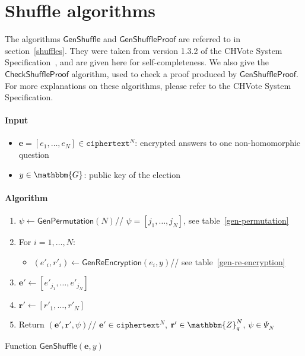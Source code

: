 \documentclass[a4paper]{article}
\newcommand{\G}{\mathbbm{G}}
\newcommand{\Z}{\mathbbm{Z}}
\begin{document}
\section{Shuffle algorithms}
\label{shuffle-algorithms}

The algorithms $\textsf{GenShuffle}$ and $\textsf{GenShuffleProof}$
are referred to in section~\ref{shuffles}. They were taken from
version 1.3.2 of the CHVote System
Specification~\cite{CHVote},
and
are given here for self-completeness. We also give the
$\textsf{CheckShuffleProof}$ algorithm, used to check a proof produced
by $\textsf{GenShuffleProof}$. For more explanations on these
algorithms, please refer to the CHVote System Specification.

\begin{table}[h]
  \begin{framed}
    \noindent\paragraph{Input}
    \begin{itemize}
    \item $\textbf{e}=[e_1,\dots,e_N]\in\texttt{ciphertext}^N$:
      encrypted answers to one non-homomorphic question
    \item $y\in\G$: public key of the election
    \end{itemize}
    \noindent\paragraph{Algorithm}
    \begin{enumerate}
    \item $\psi\leftarrow\textsf{GenPermutation}(N)$\hfill//
      $\psi=[j_1,\dots,j_N]$, see table~\ref{gen-permutation}
    \item For $i=1,\dots,N$:
      \begin{itemize}
      \item
        $(e'_i,r'_i)\leftarrow\textsf{GenReEncryption}(e_i,y)$\hfill//
        see table~\ref{gen-re-encryption}
      \end{itemize}
    \item $\textbf{e}'\leftarrow[e'_{j_1},\dots,e'_{j_N}]$
    \item $\textbf{r}'\leftarrow[r'_1,\dots,r'_N]$
    \item Return $(\textbf{e}',\textbf{r}',\psi)$\hfill//
      $\textbf{e}'\in\texttt{ciphertext}^N$, $\textbf{r}'\in\Z_q^N$,
      $\psi\in\Psi_N$
    \end{enumerate}
  \end{framed}
  \caption{Function $\mathsf{GenShuffle}(\textbf{e},y)$}
  \label{gen-shuffle}
\end{table}
\end{document}
